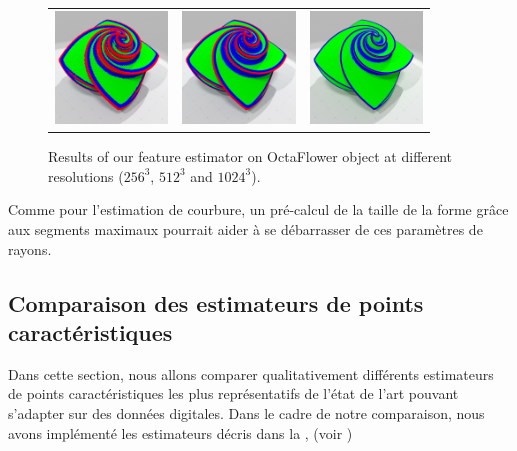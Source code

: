 \begin{figure}[ht]
  \begin{center}
    \setlength{\tabcolsep}{1pt}
    \begin{tabular}{c c c}
      \includegraphics[width=3cm]{images/Feature/OctaFlower_256_II_scale} &
      \includegraphics[width=3cm]{images/Feature/OctaFlower_512_II_scale} &
      \includegraphics[width=3cm]{images/Feature/OctaFlower_1024_II_scale}
    \end{tabular}
    \caption{Results of our feature estimator on OctaFlower object at different resolutions ($256^3$, $512^3$ and $1024^3$).\label{fig:feature-octa}}
  \end{center}
\end{figure}

Comme pour l'estimation de courbure, un pré-calcul de la taille de la forme
grâce aux segments maximaux pourrait aider à se débarrasser de ces paramètres
de rayons. 

\subsection{Comparaison des estimateurs de points caractéristiques}
\label{sec:applications:feature:II:comparison}

Dans cette section, nous allons comparer qualitativement différents estimateurs de points caractéristiques les plus représentatifs de l'état de l'art pouvant s'adapter sur des données digitales. Dans le cadre de notre comparaison, nous avons implémenté les estimateurs décris dans la , (voir )

